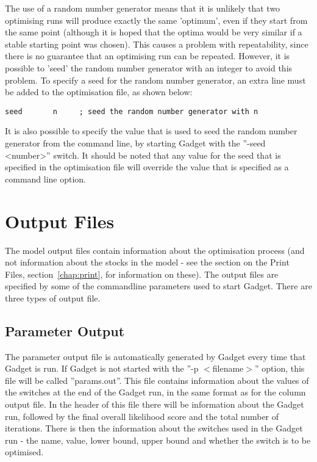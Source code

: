 \documentclass[10pt,twoside]{book}
\begin{document}
\bigskip
The use of a random number generator means that it is unlikely that two optimising runs will produce exactly the same 'optimum', even if they start from the same point (although it is hoped that the optima would be very similar if a stable starting point was chosen).  This causes a problem with repeatability, since there is no guarantee that an optimising run can be repeated.  However, it is possible to 'seed' the random number generator with an integer to avoid this problem.  To specify a seed for the random number generator, an extra line must be added to the optimisation file, as shown below:

{\small\begin{verbatim}
seed       n     ; seed the random number generator with n
\end{verbatim}}

It is also possible to specify the value that is used to seed the random number generator from the command line, by starting Gadget with the ''-seed <number>'' switch.  It should be noted that any value for the seed that is specified in the optimisation file will override the value that is specified as a command line option.

\chapter{Output Files}\label{chap:output}
The model output files contain information about the optimisation process (and not information about the stocks in the model - see the section on the Print Files, section~\ref{chap:print}, for information on these).  The output files are specified by some of the commandline parameters used to start Gadget.  There are three types of output file.

\section{Parameter Output}\label{sec:paramoutput}
The parameter output file is automatically generated by Gadget every time that Gadget is run.  If Gadget is not started with the ''-p $<$filename$>$'' option, this file will be called ''params.out''.  This file contains information about the values of the switches at the end of the Gadget run, in the same format as for the column output file.  In the header of this file there will be information about the Gadget run, followed by the final overall likelihood score and the total number of iterations.  There is then the information about the switches used in the Gadget run - the name, value, lower bound, upper bound and whether the switch is to be optimised.
\end{document}

